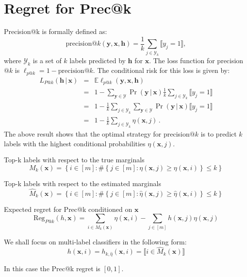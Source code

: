 \documentclass{article}
\renewcommand{\vec}[1]{\boldsymbol{#1}}
\newcommand{\bx}{\vec{x}}
\newcommand{\by}{\vec{y}}
\newcommand{\bh}{\vec{h}}
\newcommand{\calY}{\mathcal{Y}}
\newcommand{\loss}{L}
\newcommand{\assert}[1]{\llbracket #1 \rrbracket}
\newcommand{\given}{\, | \,}
\begin{document}
\newpage






\appendix

\onecolumn

\section{Regret for Prec@k}


Precision@k is formally defined as:
\begin{equation}
\mathrm{precision}@k(\by, \bx, \bh) = \frac{1}{k} \sum_{j \in \calY_k} \assert{y_j = 1},
\label{eqn:precision-at-k}
\end{equation}
where $\calY_k$ is a set of $k$ labels predicted by $\bh$ for $\bx$.
%
The loss function for precision$@k$ is $\ell_{p@k} = 1 - \mathrm{precision}@k$. The conditional risk for this loss is given by:
\begin{eqnarray*}
\loss_{P@k}(\bh \given \bx) & = & \mathbb{E} \ell_{p@k}(\by,\bx, \bh) \\
& = & 1 - \sum_{\by \in \calY} \Pr(\by \given \bx) \frac{1}{k} \sum_{j \in \calY_k} \assert{y_j = 1} \\
& = & 1 - \frac{1}{k} \sum_{j \in \calY_k} \sum_{\by \in \calY} \Pr(\by \given \bx) \assert{y_j = 1} \\
& = & 1 - \frac{1}{k} \sum_{j \in \calY_k} \eta(\bx,j) \,.
\end{eqnarray*}
%
The above result shows that the optimal strategy for precision$@k$ is to predict $k$ labels
with the highest conditional probabilities $\eta(\bx,j)$.


Top-k labels with respect to the true marginals
\[
M_k(\bx) = \left\{ i\in [m] : \# \left\{ j \in [m] : \eta(\bx, j) \ge \eta(\bx, i)  \right\} \le k\right\}
\]

Top-k labels with respect to the estimated marginals
\[
\hat{M}_k(\bx) = \left\{ i\in [m] : \# \left\{ j \in [m] : \hat{\eta}(\bx, j) \ge \hat{\eta}(\bx, i)  \right\} \le k\right\}
\]


Expected regret for Prec@k conditioned on $\bx$ 
\[
\mbox{Reg}_{P@k} (h, \bx) = \sum_{i \in M_k(\bx)} \eta (\bx ,i ) - \sum_{j \in [m]} h(\bx, j) \eta(\bx , j )
\]

We shall focus on multi-label classifiers in the following form:
\[
h(\bx,i) =h_{k, \hat{\eta}}(\bx,i) = \assert{\textstyle i \in \hat{M}_k(\bx) }
\]

In this case the Prec@k regret is $[0,1]$.
\end{document}
